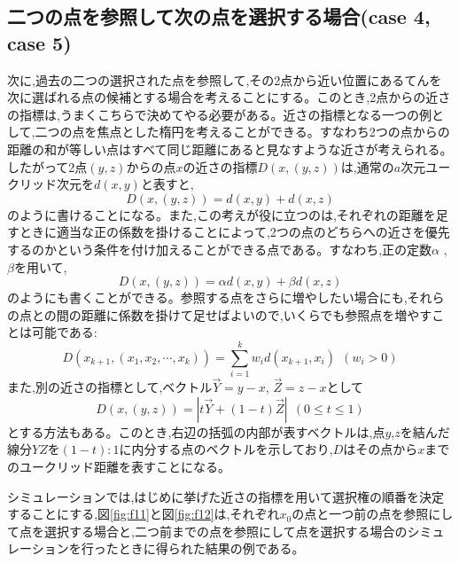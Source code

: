 \subsection{二つの点を参照して次の点を選択する場合(case 4, case 5)}

次に,過去の二つの選択された点を参照して,その2点から近い位置にあるてんを次に選ばれる点の候補とする場合を考えることにする。このとき,2点からの近さの指標は,うまくこちらで決めてやる必要がある。近さの指標となる一つの例として,二つの点を焦点とした楕円を考えることができる。すなわち2つの点からの距離の和が等しい点はすべて同じ距離にあると見なすような近さが考えられる。したがって2点$(y, z)$からの点$x$の近さの指標$D(x, (y, z))$は,通常の$a$次元ユークリッド次元を$d(x,y)$と表すと,
\[D(x, (y, z)) = d(x,y) + d(x, z)\]
のように書けることになる。また,この考えが役に立つのは,それぞれの距離を足すときに適当な正の係数を掛けることによって,2つの点のどちらへの近さを優先するのかという条件を付け加えることができる点である。すなわち,正の定数$\alpha$ ,$\beta$を用いて,
\[D(x, (y, z)) = \alpha d(x,y) + \beta d(x, z)\]
のようにも書くことができる。参照する点をさらに増やしたい場合にも,それらの点との間の距離に係数を掛けて足せばよいので,いくらでも参照点を増やすことは可能である:
\[D(x_{k+1}, (x_{1}, x_{2}, \cdots , x_{k})) = \sum_{i=1}^{k}w_{i}d(x_{k+1}, x_{i})\ \ (w_{i} > 0)\]
また,別の近さの指標として,ベクトル$\vec{Y} = y-x$, $\vec{Z} = z-x$として
\[D(x, (y,z)) = |t\vec{Y} + (1-t)\vec{Z}|\ \ (0 \le t \le 1)\]
とする方法もある。このとき,右辺の括弧の内部が表すベクトルは,点$y$,$z$を結んだ線分$YZ$を$(1-t):1$に内分する点のベクトルを示しており,$D$はその点から$x$までのユークリッド距離を表すことになる。

シミュレーションでは,はじめに挙げた近さの指標を用いて選択権の順番を決定することにする,図\ref{fig:f11}と図\ref{fig:f12}は,それぞれ$x_{0}$の点と一つ前の点を参照にして点を選択する場合と,二つ前までの点を参照にして点を選択する場合のシミュレーションを行ったときに得られた結果の例である。

